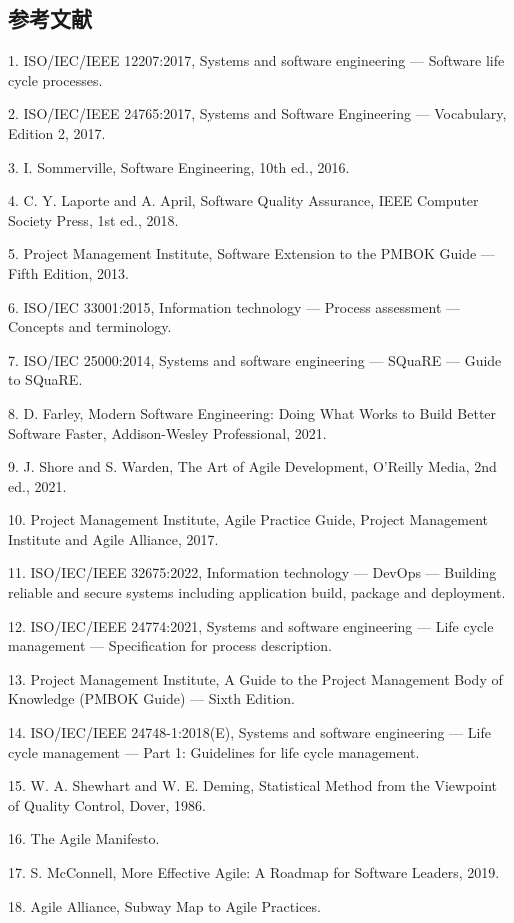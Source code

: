 \documentclass[a4paper,11pt]{ltjsarticle}
\numberwithin{figure}{section}
\numberwithin{table}{section}
\begin{document}
\subsection{参考文献}
1. ISO/IEC/IEEE 12207:2017, Systems and software engineering — Software life cycle processes.

2. ISO/IEC/IEEE 24765:2017, Systems and Software Engineering — Vocabulary, Edition 2, 2017.

3. I. Sommerville, Software Engineering, 10th ed., 2016.

4. C. Y. Laporte and A. April, Software Quality Assurance, IEEE Computer Society Press, 1st ed., 2018.

5. Project Management Institute, Software Extension to the PMBOK Guide — Fifth Edition, 2013.

6. ISO/IEC 33001:2015, Information technology — Process assessment — Concepts and terminology.

7. ISO/IEC 25000:2014, Systems and software engineering — SQuaRE — Guide to SQuaRE.

8. D. Farley, Modern Software Engineering: Doing What Works to Build Better Software Faster, Addison-Wesley Professional, 2021.

9. J. Shore and S. Warden, The Art of Agile Development, O’Reilly Media, 2nd ed., 2021.

10. Project Management Institute, Agile Practice Guide, Project Management Institute and Agile Alliance, 2017.

11. ISO/IEC/IEEE 32675:2022, Information technology — DevOps — Building reliable and secure systems including application build, package and deployment.

12. ISO/IEC/IEEE 24774:2021, Systems and software engineering — Life cycle management — Specification for process description.

13. Project Management Institute, A Guide to the Project Management Body of Knowledge (PMBOK Guide) — Sixth Edition.

14. ISO/IEC/IEEE 24748-1:2018(E), Systems and software engineering — Life cycle management — Part 1: Guidelines for life cycle management.

15. W. A. Shewhart and W. E. Deming, Statistical Method from the Viewpoint of Quality Control, Dover, 1986.

16. The Agile Manifesto.

17. S. McConnell, More Effective Agile: A Roadmap for Software Leaders, 2019.

18. Agile Alliance, Subway Map to Agile Practices.
\end{document}
